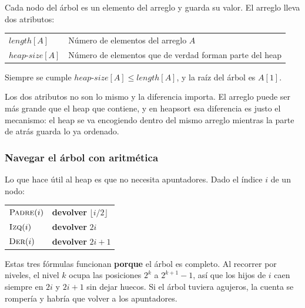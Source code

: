 \documentclass[11pt,letterpaper]{article}
\begin{document}
Cada nodo del árbol es un elemento del arreglo y guarda su valor. El
arreglo lleva dos atributos:

\begin{center}
\begin{tabular}{ll}
  \toprule
  $\mathit{length}[A]$    & Número de elementos del arreglo $A$ \\
  $\mathit{heap\text{-}size}[A]$ & Número de elementos que de verdad
                                   forman parte del heap \\
  \bottomrule
\end{tabular}
\end{center}

Siempre se cumple
$\mathit{heap\text{-}size}[A] \leq \mathit{length}[A]$, y la raíz del
árbol es $A[1]$.

\begin{ojo}
  Los dos atributos no son lo mismo y la diferencia importa. El
  arreglo puede ser más grande que el heap que contiene, y en
  heapsort esa diferencia es justo el mecanismo: el heap se va
  encogiendo dentro del mismo arreglo mientras la parte de atrás
  guarda lo ya ordenado.
\end{ojo}

\subsubsection*{Navegar el árbol con aritmética}

Lo que hace útil al heap es que no necesita apuntadores. Dado el
índice $i$ de un nodo:

\begin{center}
\begin{tabular}{ll}
  \toprule
  $\textsc{Padre}(i)$    & \textbf{devolver} $\lfloor i/2 \rfloor$ \\
  $\textsc{Izq}(i)$      & \textbf{devolver} $2i$ \\
  $\textsc{Der}(i)$      & \textbf{devolver} $2i + 1$ \\
  \bottomrule
\end{tabular}
\end{center}

\begin{idea}
  Estas tres fórmulas funcionan \textbf{porque} el árbol es completo.
  Al recorrer por niveles, el nivel $k$ ocupa las posiciones
  $2^k$ a $2^{k+1} - 1$, así que los hijos de $i$ caen siempre en
  $2i$ y $2i+1$ sin dejar huecos. Si el árbol tuviera agujeros, la
  cuenta se rompería y habría que volver a los apuntadores.
\end{idea}
\end{document}
